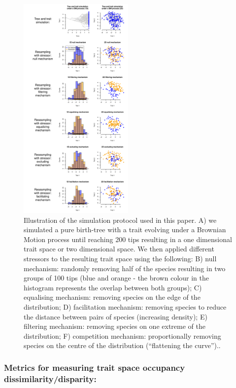 \documentclass[12pt,letterpaper]{article}
\begin{document}
\begin{figure}[!htbp]
\centering
   \includegraphics[width=0.5\textwidth]{Figures/simulation_protocol.pdf}
\caption{\scriptsize{Illustration of the simulation protocol used in this paper.
A) we simulated a pure birth-tree with a trait evolving under a Brownian Motion process until reaching 200 tips resulting in a one dimensional trait space or two dimensional space.
We then applied different stressors to the resulting trait space using the following:
B) null mechanism: randomly removing half of the species resulting in two groups of 100 tips (blue and orange - the brown colour in the histogram represents the overlap between both groups);
C) equalising mechanism: removing species on the edge of the distribution;
D) facilitation mechanism: removing species to reduce the distance between pairs of species (increasing density);
E) filtering mechanism: removing species on one extreme of the distribution;
F) competition mechanism: proportionally removing species on the centre of the distribution (“flattening the curve”)..}}
\label{Fig:simulations}
\end{figure}
\bigskip

\subsubsection{Metrics for measuring trait space occupancy dissimilarity/disparity:}
\end{document}
